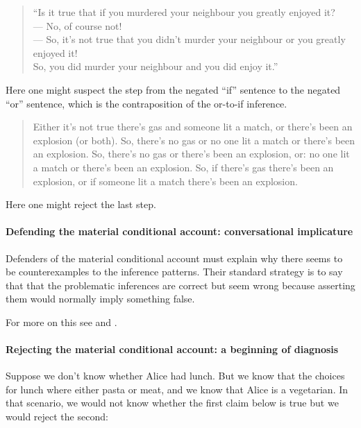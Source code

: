 \documentclass[../../../include/open-logic-section]{subfiles}
\begin{document}
\begin{quote}
	``Is it true that if you murdered your neighbour you greatly enjoyed it?\\
	--- No, of course not!\\
	--- So, it's not true that you didn't murder your neighbour or you greatly enjoyed it!\\
	So, you did murder your neighbour and you did enjoy it.''
\end{quote}

Here one might suspect the step from the negated ``if'' sentence to the negated ``or'' sentence, which is the contraposition of the or-to-if inference.

\begin{quote}
	Either it's not true there's gas and someone lit a match, or there's been an explosion (or both).
	So, there's no gas or no one lit a match or there's been an explosion. 
	So, there's no gas or there's been an explosion, or: no one lit a match or there's been an explosion.
	So, if there's gas there's been an explosion, or if someone lit a match there's been an explosion. 
\end{quote}

Here one might reject the last step.  

\paragraph*{Defending the material conditional account: conversational implicature}

Defenders of the material conditional account must explain why there seems to be counterexamples to the inference patterns. Their standard strategy is to say that that the problematic inferences are correct but seem wrong because asserting them would normally imply something false. 

For more on this see \citet{BennettPGC} and \citet{PriestINCL}.

\paragraph*{Rejecting the material conditional account: a beginning of diagnosis}

Suppose we don't know whether Alice had lunch. But we know that the choices for lunch where either pasta or meat, and we know that Alice is a vegetarian. In that scenario, we would not know whether the first claim below is true but we would reject the second:
\end{document}
